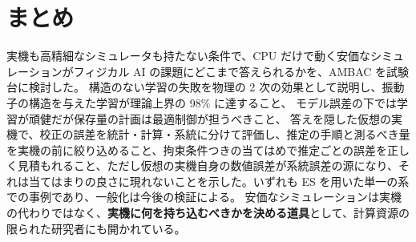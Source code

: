 \documentclass[paper=a4paper,fontsize=10pt,twocolumn,column_gap=2zw,line_length=24zw,number_of_lines=46,head_space=20mm]{jlreq}
\begin{document}
\section{まとめ}

実機も高精細なシミュレータも持たない条件で、CPU だけで動く安価なシミュレーションがフィジカル AI の課題にどこまで答えられるかを、AMBAC を試験台に検討した。
構造のない学習の失敗を物理の 2 次の効果として説明し、振動子の構造を与えた学習が理論上界の 98\% に達すること、
モデル誤差の下では学習が頑健だが保存量の計画は最適制御が担うべきこと、
答えを隠した仮想の実機で、校正の誤差を統計・計算・系統に分けて評価し、推定の手順と測るべき量を実機の前に絞り込めること、拘束条件つきの当てはめで推定ごとの誤差を正しく見積もれること、ただし仮想の実機自身の数値誤差が系統誤差の源になり、それは当てはまりの良さに現れないことを示した。いずれも ES を用いた単一の系での事例であり、一般化は今後の検証による。
安価なシミュレーションは実機の代わりではなく、\textbf{実機に何を持ち込むべきかを決める道具}として、計算資源の限られた研究者にも開かれている。
\end{document}
